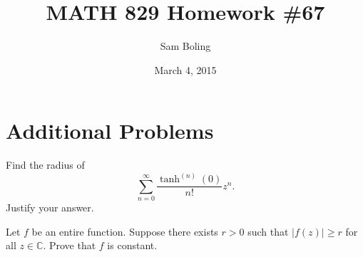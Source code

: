 \documentclass{article}
\title{MATH 829 Homework \#67}
\date{March 4, 2015}
\author{Sam Boling}
\newcounter{Problem}
\newenvironment{Problem}{\begin{Exercise}[name={Problem},
                                          counter={Problem}]}
                        {\end{Exercise}}
\begin{document}
\begin{titlepage}
\maketitle
\end{titlepage}

\section{Additional Problems}
\begin{Problem}
Find the radius of
$$
\sum_{n=0}^\infty \frac{\tanh^{(n)}(0)}{n!} z^n.
$$
Justify your answer.
\end{Problem}

\begin{Problem}
Let $f$ be an entire function. Suppose there exists $r > 0$ such that
$|f(z)| \geq r$ for all $z \in \mathbb{C}$. Prove that $f$ is constant.
\end{Problem}
\end{document}
